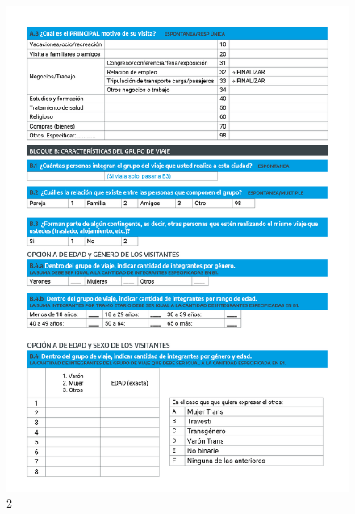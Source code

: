 \documentclass[
]{book}
\begin{document}
\begin{figure}
\includegraphics[width=17.22in]{imagenes/graf02} \caption{2}\label{fig:002}
\end{figure}
\end{document}

